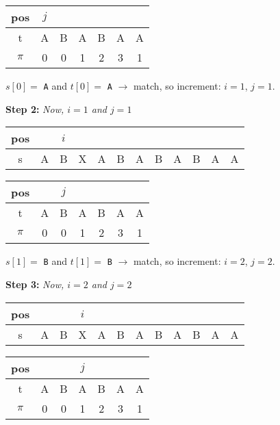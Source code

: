 \begin{table}[H]
\centering
\begin{tabular}{|c|c|c|c|c|c|c|}
\hline
pos   & $j$ &   &   &   &   &   \\ \hline
t     & A & B & A & B & A & A \\ \hline
$\pi$ & 0 & 0 & 1 & 2 & 3 & 1 \\ \hline
\end{tabular}
\end{table}

$s[0] = $ \texttt{A} and $t[0] = $ \texttt{A} $\longrightarrow$ match, so increment: $i = 1$, $j = 1$.

\textbf{Step 2: }\textit{Now, $i = 1$ and $j = 1$}

\begin{table}[H]
\centering
\begin{tabular}{|c|c|c|c|c|c|c|c|c|c|c|c|}
\hline
pos   &   &$i$&   &   &   &   &   &   &   &   &   \\ \hline
s     & A & B & X & A & B & A & B & A & B & A & A \\ \hline
\end{tabular}
\end{table}

\begin{table}[H]
\centering
\begin{tabular}{|c|c|c|c|c|c|c|}
\hline
pos   &   & $j$ &   &   &   &   \\ \hline
t     & A & B & A & B & A & A \\ \hline
$\pi$ & 0 & 0 & 1 & 2 & 3 & 1 \\ \hline
\end{tabular}
\end{table}

$s[1] = $ \texttt{B} and $t[1] = $ \texttt{B} $\longrightarrow$ match, so increment: $i = 2$, $j = 2$.

\textbf{Step 3: }\textit{Now, $i = 2$ and $j = 2$}

\begin{table}[H]
\centering
\begin{tabular}{|c|c|c|c|c|c|c|c|c|c|c|c|}
\hline
pos   &   &   &$i$&   &   &   &   &   &   &   &   \\ \hline
s     & A & B & X & A & B & A & B & A & B & A & A \\ \hline
\end{tabular}
\end{table}

\begin{table}[H]
\centering
\begin{tabular}{|c|c|c|c|c|c|c|}
\hline
pos   &   &   & $j$ &   &   &   \\ \hline
t     & A & B & A & B & A & A \\ \hline
$\pi$ & 0 & 0 & 1 & 2 & 3 & 1 \\ \hline
\end{tabular}
\end{table}


